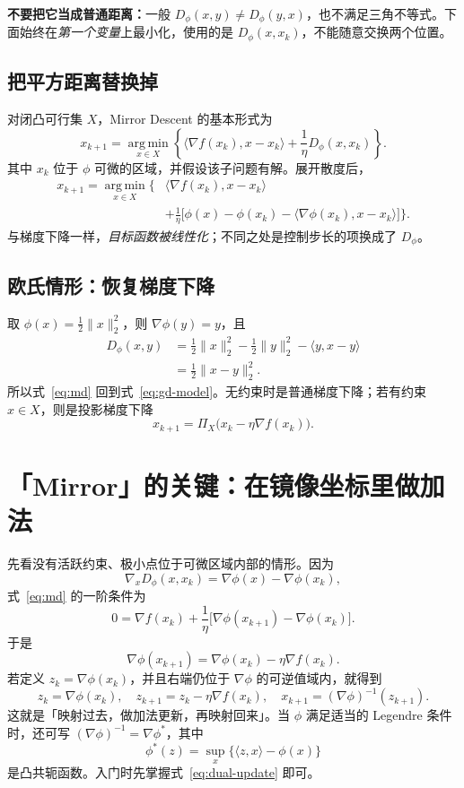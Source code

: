 \documentclass[11pt,a4paper]{ctexart}
\newcommand{\argmin}{\operatorname*{arg\,min}}
\begin{document}
\textbf{不要把它当成普通距离：}一般 $D_\phi(x,y)\neq D_\phi(y,x)$，也不满足三角不等式。下面始终在\emph{第一个变量}上最小化，使用的是 $D_\phi(x,x_k)$，不能随意交换两个位置。

\subsection{把平方距离替换掉}
对闭凸可行集 $X$，Mirror Descent 的基本形式为
\begin{equation}\label{eq:md}
\boxed{x_{k+1}=\argmin_{x\in X}\left\{
\langle\nabla f(x_k),x-x_k\rangle+\frac1\eta D_\phi(x,x_k)
\right\}.}
\end{equation}
其中 $x_k$ 位于 $\phi$ 可微的区域，并假设该子问题有解。展开散度后，
\begin{align*}
x_{k+1}=\argmin_{x\in X}\biggl\{
&\langle\nabla f(x_k),x-x_k\rangle\\
&+\frac1\eta\bigl[\phi(x)-\phi(x_k)-\langle\nabla\phi(x_k),x-x_k\rangle\bigr]
\biggr\}.
\end{align*}
与梯度下降一样，\emph{目标函数被线性化}；不同之处是控制步长的项换成了 $D_\phi$。

\subsection{欧氏情形：恢复梯度下降}
取 $\phi(x)=\frac12\|x\|_2^2$，则 $\nabla\phi(y)=y$，且
\begin{align*}
D_\phi(x,y)
&=\frac12\|x\|_2^2-\frac12\|y\|_2^2-\langle y,x-y\rangle\\
&=\frac12\|x-y\|_2^2.
\end{align*}
所以式~\eqref{eq:md} 回到式~\eqref{eq:gd-model}。无约束时是普通梯度下降；若有约束 $x\in X$，则是投影梯度下降
\[
x_{k+1}=\Pi_X\bigl(x_k-\eta\nabla f(x_k)\bigr).
\]

\section{「Mirror」的关键：在镜像坐标里做加法}
先看没有活跃约束、极小点位于可微区域内部的情形。因为
\[
\nabla_xD_\phi(x,x_k)=\nabla\phi(x)-\nabla\phi(x_k),
\]
式~\eqref{eq:md} 的一阶条件为
\[
0=\nabla f(x_k)+\frac1\eta\bigl[\nabla\phi(x_{k+1})-\nabla\phi(x_k)\bigr].
\]
于是
\begin{equation}\label{eq:dual-update}
\boxed{\nabla\phi(x_{k+1})=\nabla\phi(x_k)-\eta\nabla f(x_k).}
\end{equation}
若定义 $z_k=\nabla\phi(x_k)$，并且右端仍位于 $\nabla\phi$ 的可逆值域内，就得到
\begin{equation}\label{eq:mirror-three}
\boxed{z_k=\nabla\phi(x_k),\quad
z_{k+1}=z_k-\eta\nabla f(x_k),\quad
x_{k+1}=(\nabla\phi)^{-1}(z_{k+1}).}
\end{equation}
这就是「映射过去，做加法更新，再映射回来」。当 $\phi$ 满足适当的 Legendre 条件时，还可写 $(\nabla\phi)^{-1}=\nabla\phi^*$，其中
\[
\phi^*(z)=\sup_x\{\langle z,x\rangle-\phi(x)\}
\]
是凸共轭函数。入门时先掌握式~\eqref{eq:dual-update} 即可。
\end{document}
